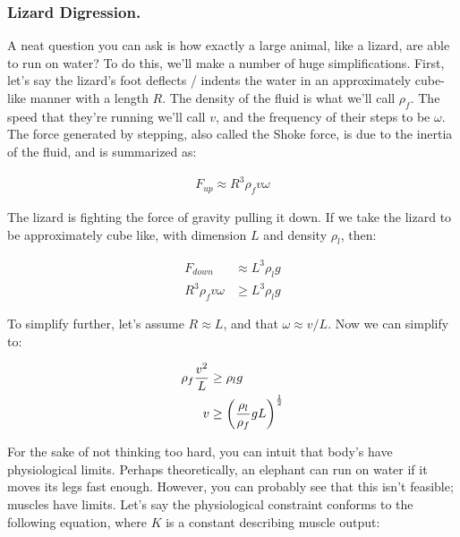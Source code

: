 \subsubsection{Lizard Digression.}

A neat question you can ask is how exactly a large animal, like a lizard, are able to run on water? To do this, we'll make a number of huge simplifications. First, let's say the lizard's foot deflects / indents the water in an approximately cube-like manner with a length $R$. The density of the fluid is what we'll call $\rho_f$. The speed that they're running we'll call $v$, and the frequency of their steps to be $\omega$. The force generated by stepping, also called the Shoke force, is due to the inertia of the fluid, and is summarized as: 

\begin{equation} \label{lizard1}
\begin{split}
F_{up} \approx R^3\rho_f v\omega
\end{split}
\end{equation}

The lizard is fighting the force of gravity pulling it down. If we take the lizard to be approximately cube like, with dimension $L$ and density $\rho_l$, then: 

\begin{equation} \label{lizard2}
\begin{split}
F_{down} &\approx L^3\rho_l g \\
R^3\rho_f v\omega &\geq L^3\rho_l g
\end{split}
\end{equation}

To simplify further, let's assume $R \approx L$, and that $\omega \approx v / L$. Now we can simplify to: 

\begin{equation} \label{lizard2}
\begin{split}
\rho_f \frac{v^2}{L} &\geq \rho_l g \\
v &\geq \left(\frac{\rho_l}{\rho_f} gL\right)^{\frac{1}{2}}
\end{split}
\end{equation}

For the sake of not thinking too hard, you can intuit that body's have physiological limits. Perhaps theoretically, an elephant can run on water if it moves its legs fast enough. However, you can probably see that this isn't feasible; muscles have limits. Let's say the physiological constraint conforms to the following equation, where $K$ is a constant describing muscle output: 

